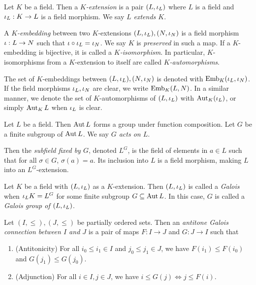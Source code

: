 \documentclass[main.tex]{subfiles}
\begin{document}
\begin{dfn}  
  
  Let $K$ be a field. 
  Then a \emph{$K$-extension} is a pair $(L,\iota_L)$
  where $L$ is a field and $\iota_L : K \to L$ is a field morphism. 
  We say \emph{$L$ extends $K$}. 

  A \emph{$K$-embedding} between 
  two $K$-extensions $(L,\iota_L), (N,\iota_N)$ is 
  a field morphism $\iota : L \to N$ such that $\iota \circ \iota_L = \iota_N$.
  We say $K$ is \emph{preserved} in such a map.
  If a $K$-embedding is bijective, 
  it is called a \emph{$K$-isomorphism}. 
  In particular, 
  $K$-isomorphisms from a $K$-extension to itself are 
  called \emph{$K$-automorphisms}. 

  The set of $K$-embeddings between $(L,\iota_L), (N,\iota_N)$ is 
  denoted with $\mathrm{Emb}_{K}(\iota_L, \iota_N)$. 
  If the field morphisms $\iota_L, \iota_N$ are clear, 
  we write $\mathrm{Emb}_{K}(L, N)$. 
  In a similar manner, 
  we denote the set of $K$-automorphisms of $(L,\iota_L)$ with 
  $\operatorname{Aut}_K(\iota_L)$, or simply $\operatorname{Aut}_K L$ when $\iota_L$ is clear. 

\end{dfn}

\begin{dfn}
  
  Let $L$ be a field. 
  Then $\operatorname{Aut} L$ forms a group under function composition. 
  Let $G$ be a finite subgroup of $\operatorname{Aut} L$.
  We say \emph{$G$ acts on $L$}. 

  Then the \emph{subfield fixed by $G$}, denoted $L^G$, 
  is the field of elements in $a \in L$ such that 
  for all $\sigma \in G$, $\sigma (a) = a$. 
  Its inclusion into $L$ is a field morphism, 
  making $L$ into an $L^G$-extension. 

  Let $K$ be a field with $(L,\iota_L)$ as a $K$-extension. 
  Then $(L,\iota_L)$ is called a \emph{Galois} when 
  $\iota_L K = L^G$ for some finite subgroup $G \subseteq \operatorname{Aut} L$. 
  In this case, $G$ is called a \emph{Galois group of $(L,\iota_L)$}. 
\end{dfn}

\begin{dfn} 

  Let $(I,\leq), (J, \leq)$ be partially ordered sets. 
  Then an \emph{antitone Galois connection between $I$ and $J$} is 
  a pair of maps $F : I \to J$ and $G : J \to I$ such that
  \begin{enumerate}
    \item (Antitonicity) 
    For all $i_0 \leq i_1 \in I$ and $j_0 \leq j_1 \in J$, 
    we have $F(i_1) \leq F(i_0)$ and $G(j_1) \leq G(j_0)$. 
    \item (Adjunction) For all $i \in I, j \in J$, 
    we have $i \leq G(j) \iff j \leq F(i)$. 
  \end{enumerate}
\end{dfn}
\end{document}
